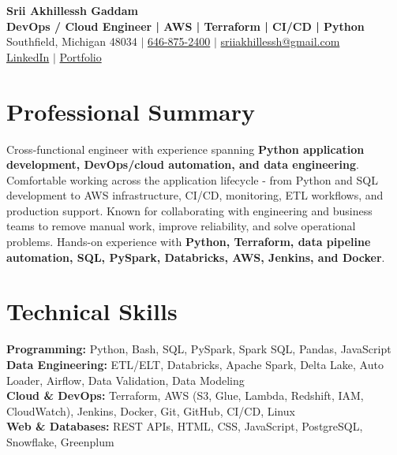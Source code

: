 \documentclass[letterpaper,10pt]{article}
\begin{document}
\fontsize{9.35pt}{10.45pt}\selectfont

\begin{center}
    {\LARGE \textbf{Srii Akhillessh Gaddam}} \\[-1pt]
    \textbf{DevOps / Cloud Engineer | AWS | Terraform | CI/CD | Python} \\[2pt]
    Southfield, Michigan 48034 $|$
    \href{tel:6468752400}{646-875-2400} $|$
    \href{mailto:sriiakhillessh@gmail.com}{sriiakhillessh@gmail.com} \\[1pt]
    \href{https://www.linkedin.com/in/srii-akhiilessh-gaddam-b48668191/}{LinkedIn} $|$
    \href{https://sriiakhillesshg.github.io/portfolio/}{Portfolio}
\end{center}
\vspace{-8pt}

\section{Professional Summary}
\small{Cross-functional engineer with experience spanning \textbf{Python application development, DevOps/cloud automation, and data engineering}. Comfortable working across the application lifecycle - from Python and SQL development to AWS infrastructure, CI/CD, monitoring, ETL workflows, and production support. Known for collaborating with engineering and business teams to remove manual work, improve reliability, and solve operational problems. Hands-on experience with \textbf{Python, Terraform, data pipeline automation, SQL, PySpark, Databricks, AWS, Jenkins, and Docker}.}

\section{Technical Skills}
\small{
\textbf{Programming:} Python, Bash, SQL, PySpark, Spark SQL, Pandas, JavaScript \\
\textbf{Data Engineering:} ETL/ELT, Databricks, Apache Spark, Delta Lake, Auto Loader, Airflow, Data Validation, Data Modeling \\
\textbf{Cloud \& DevOps:} Terraform, AWS (S3, Glue, Lambda, Redshift, IAM, CloudWatch), Jenkins, Docker, Git, GitHub, CI/CD, Linux \\
\textbf{Web \& Databases:} REST APIs, HTML, CSS, JavaScript, PostgreSQL, Snowflake, Greenplum
}
\end{document}

